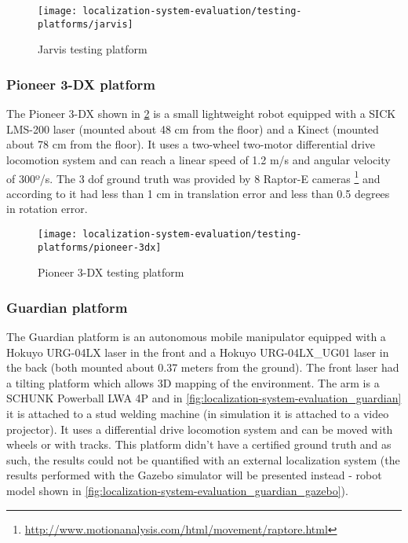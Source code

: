 \begin{figure}[hb]
	\centering
	\texttt{[image: localization-system-evaluation/testing-platforms/jarvis]}
	\caption{Jarvis testing platform}
	\label{fig:localization-system-evaluation_jarvis}
\end{figure}


\subsubsection{Pioneer 3-DX platform}

The Pioneer 3-DX shown in \cref{fig:localization-system-evaluation_pioneer} is a small lightweight robot equipped with a SICK LMS-200 laser (mounted about 48 cm from the floor) and a Kinect (mounted about 78 cm from the floor). It uses a two-wheel two-motor differential drive locomotion system and can reach a linear speed of 1.2 m/s and angular velocity of 300º/s. The 3 \gls{dof} ground truth was provided by 8 Raptor-E cameras \footnote{\url{http://www.motionanalysis.com/html/movement/raptore.html}} and according to \cite{Sturm2012} it had less than 1 cm in translation error and less than 0.5 degrees in rotation error.

\begin{figure}[hb]
	\centering
	\texttt{[image: localization-system-evaluation/testing-platforms/pioneer-3dx]}
	\caption{Pioneer 3-DX testing platform \cite{Sturm2012}}
	\label{fig:localization-system-evaluation_pioneer}
\end{figure}


\subsubsection{Guardian platform}

The Guardian platform is an autonomous mobile manipulator equipped with a Hokuyo URG-04LX laser in the front and a Hokuyo URG-04LX\_UG01 laser in the back (both mounted about 0.37 meters from the ground). The front laser had a tilting platform which allows 3D mapping of the environment. The arm is a SCHUNK Powerball LWA 4P and in \cref{fig:localization-system-evaluation_guardian} it is attached to a stud welding machine (in simulation it is attached to a video projector). It uses a differential drive locomotion system and can be moved with wheels or with tracks. This platform didn't have a certified ground truth and as such, the results could not be quantified with an external localization system (the results performed with the Gazebo simulator will be presented instead - robot model shown in \cref{fig:localization-system-evaluation_guardian_gazebo}).

